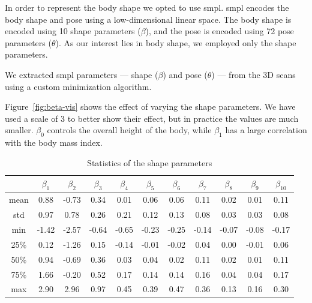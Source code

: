 In order to represent the body shape we opted to use \gls{smpl}. \gls{smpl}
encodes the body shape and pose using a low-dimensional linear space. The body
shape is encoded using 10 shape parameters ($\beta$), and the pose is encoded
using 72 pose parameters ($\theta$). As our interest lies in body shape, we
employed only the shape parameters.

We extracted \gls{smpl} parameters --- shape ($\beta$) and pose ($\theta$) ---
from the 3D scans using a custom minimization algorithm.



Figure~\ref{fig:beta-vis} shows the effect of varying the shape parameters. We
have used a scale of 3 to better show their effect, but in practice the values
are much smaller. $\beta_0$ controls the overall height of the body, while
$\beta_1$ has a large correlation with the body mass index.

\begin{table}[h]
    \centering
    \begin{tabular}{c | c c c c c c c c c c}
        \toprule
             & $\beta_1$ & $\beta_2$ & $\beta_3$ & $\beta_4$ & $\beta_5$ & $\beta_6$ & $\beta_7$ & $\beta_8$ & $\beta_9$ & $\beta_{10}$ \\
        \midrule
        mean & 0.88      & -0.73     & 0.34      & 0.01      & 0.06      & 0.06      & 0.11      & 0.02      & 0.01      & 0.11         \\

        std  & 0.97      & 0.78      & 0.26      & 0.21      & 0.12      & 0.13      & 0.08      & 0.03      & 0.03      & 0.08         \\

        min  & -1.42     & -2.57     & -0.64     & -0.65     & -0.23     & -0.25     & -0.14     & -0.07     & -0.08     &
        -0.17                                                                                                                           \\

        25\% & 0.12      & -1.26     & 0.15      & -0.14     & -0.01     & -0.02     & 0.04      & 0.00      & -0.01     & 0.06         \\

        50\% & 0.94      & -0.69     & 0.36      & 0.03      & 0.04      & 0.02      & 0.11      & 0.02      & 0.01      & 0.11         \\

        75\% & 1.66      & -0.20     & 0.52      & 0.17      & 0.14      & 0.14      & 0.16      & 0.04      & 0.04      & 0.17         \\

        max  & 2.90      & 2.96      & 0.97      & 0.45      & 0.39      & 0.47      & 0.36      & 0.13      & 0.16      & 0.30         \\
        \bottomrule
    \end{tabular}
    \caption{Statistics of the shape parameters}
\end{table}